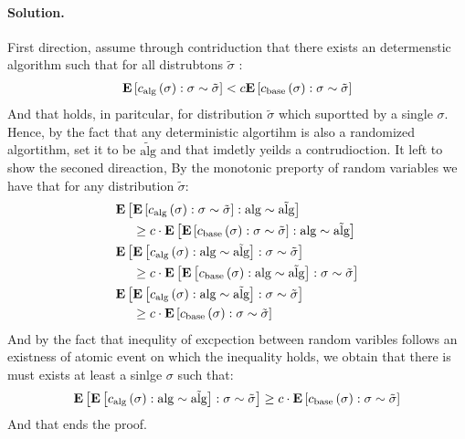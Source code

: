 \documentclass{article}
\begin{document}
\begin{multicols*}{2}
  \paragraph{Solution.} First direction, assume through contriduction that there exists an determenstic algorithm such that for all distrubtons $\tilde{\sigma}$ :
  \begin{equation*}
    \begin{split}
      \dsig{  \calg\left( \sigma \right)  } < c \dsig{ \cbase \left( \sigma \right)  }
    \end{split}
  \end{equation*} And that holds, in paritcular, for distribution $\tilde{\sigma}$ which suportted by a single $\sigma$. Hence, by the fact that any deterministic algortihm is also a randomized algortithm, set it to be $ \tilde{\text{alg}}$ and that imdetly yeilds a contrudioction. 
  It left to show the seconed direaction, By the monotonic preporty of random variables we have that for any distribution $\tilde{\sigma}$: 
  \begin{equation*}
    \begin{split}
    &  \dalg{ \dsig{ \calg\left( \sigma \right) } } \\
    & \ \  \ \ \ge c \cdot \dalg{ \dsig{  \cbase\left( \sigma \right) } } \\
& \dsig{ \dalg{ \calg\left( \sigma \right) } } \\
    &  \ \  \ \ \ge c \cdot \dsig{ \dalg{  \cbase\left( \sigma \right) } } \\
& \dsig{ \dalg{ \calg\left( \sigma \right) } } \\
    & \ \ \ \  \ge c \cdot \dsig{  \cbase\left( \sigma \right) }  
    \end{split}
  \end{equation*}
  And by the fact that inequlity of excpection between random varibles follows an existness of atomic event on which the inequality holds, we obtain that there is must exists at least a sinlge $\sigma$ such that:
  \begin{equation*}
    \begin{split}
       \dsig{ \dalg{ \calg\left( \sigma \right) } } \ge c \cdot \dsig{  \cbase\left( \sigma \right) }  
    \end{split}
  \end{equation*}
  And that ends the proof.
\end{multicols*}
\printbibliography 
\end{document}
